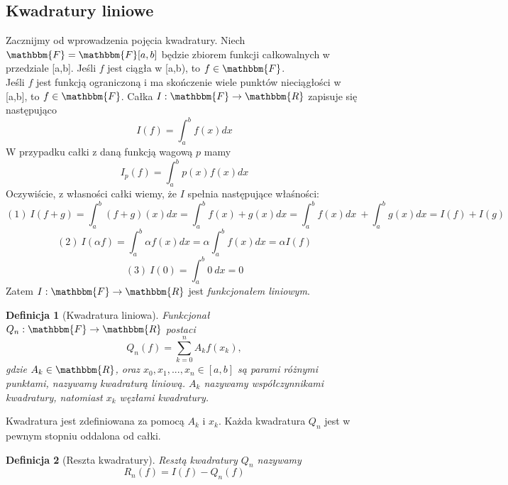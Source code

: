 \documentclass{article}
\newtheorem{defi}{Definicja}
\begin{document}
\subsection{Kwadratury liniowe}
Zacznijmy od wprowadzenia pojęcia kwadratury. Niech $\mathbbm{F} = \mathbbm{F}[a,b]$ będzie zbiorem funkcji całkowalnych w przedziale [a,b].
Jeśli $f$ jest ciągła w [a,b), to $f \in \mathbbm{F}$. \\
Jeśli $f$ jest funkcją ograniczoną i ma skończenie wiele punktów nieciągłości w [a,b], to $f \in \mathbbm{F}$.
Całka $I: \mathbbm{F} \to \mathbbm{R}$ zapisuje się następująco
\begin{equation*}
	I(f) = \int_a^b f(x) dx
\end{equation*}
W przypadku całki z daną funkcją wagową $p$ mamy
\begin{equation*}
	I_p(f) = \int_a^b p(x) f(x) dx
\end{equation*}
Oczywiście, z własności całki wiemy, że $I$ spełnia następujące właśności:
\begin{equation*}
	(1) \ I(f + g) = \int_a^b (f+g)(x) dx = \int_a^b f(x) + g(x) dx = \int_a^b f(x) dx \ + \int_a^b g(x) dx = I(f) + I(g)
\end{equation*}
\begin{equation*}
	(2) \ I(\alpha f) = \int_a^b \alpha f(x) dx = \alpha \int_a^b f(x) dx = \alpha I(f)
\end{equation*}
\begin{equation*}
	(3) \ I(0) = \int_a^b 0 \ dx = 0
\end{equation*}
Zatem $I: \mathbbm{F} \to \mathbbm{R}$ jest \emph{funkcjonałem liniowym}.
\begin{defi}[Kwadratura liniowa]
	Funkcjonał $Q_n: \mathbbm{F} \to \mathbbm{R}$ postaci
	\begin{equation}
		Q_n(f) = \sum_{k = 0}^n A_k f(x_k),
	\end{equation}
	gdzie $A_k \in \mathbbm{R}$, oraz $x_0, x_1, ..., x_n \in [a,b]$ są parami różnymi punktami,
	nazywamy kwadraturą liniową. $A_k$ nazywamy współczynnikami kwadratury, natomiast $x_k$ węzłami kwadratury.
\end{defi}
Kwadratura jest zdefiniowana za pomocą $A_k$ i $x_k$. Każda kwadratura $Q_n$ jest w pewnym stopniu oddalona od całki.
\begin{defi}[Reszta kwadratury]
	Resztą kwadratury $Q_n$ nazywamy
	\begin{equation}
		R_n(f) = I(f) - Q_n(f)
	\end{equation}
\end{defi}
\end{document}
